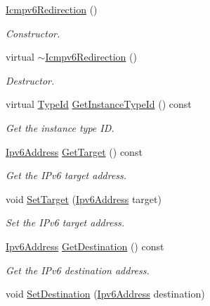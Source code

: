 \begin{DoxyCompactItemize}
\item 
\hyperlink{classns3_1_1Icmpv6Redirection_a6eace6bcc5baaaa530ad738751d29d6c}{Icmpv6\+Redirection} ()
\begin{DoxyCompactList}\small\item\em Constructor. \end{DoxyCompactList}\item 
virtual \hyperlink{classns3_1_1Icmpv6Redirection_a714b0b5bb2fae36e1659a6a1a7512d0d}{$\sim$\+Icmpv6\+Redirection} ()
\begin{DoxyCompactList}\small\item\em Destructor. \end{DoxyCompactList}\item 
virtual \hyperlink{classns3_1_1TypeId}{Type\+Id} \hyperlink{classns3_1_1Icmpv6Redirection_a5cb100dd7c2881b389998086ac890d55}{Get\+Instance\+Type\+Id} () const 
\begin{DoxyCompactList}\small\item\em Get the instance type ID. \end{DoxyCompactList}\item 
\hyperlink{classns3_1_1Ipv6Address}{Ipv6\+Address} \hyperlink{classns3_1_1Icmpv6Redirection_ab03c0b6e0f4bf1472f9ab6f5ea2e63a8}{Get\+Target} () const 
\begin{DoxyCompactList}\small\item\em Get the I\+Pv6 target address. \end{DoxyCompactList}\item 
void \hyperlink{classns3_1_1Icmpv6Redirection_ac93abd1d3faf8ea414f80426905b6d2b}{Set\+Target} (\hyperlink{classns3_1_1Ipv6Address}{Ipv6\+Address} target)
\begin{DoxyCompactList}\small\item\em Set the I\+Pv6 target address. \end{DoxyCompactList}\item 
\hyperlink{classns3_1_1Ipv6Address}{Ipv6\+Address} \hyperlink{classns3_1_1Icmpv6Redirection_a266520561720bfd65eb8d6be7490ff2b}{Get\+Destination} () const 
\begin{DoxyCompactList}\small\item\em Get the I\+Pv6 destination address. \end{DoxyCompactList}\item 
void \hyperlink{classns3_1_1Icmpv6Redirection_a98374c9b46e18bed57c204c155b311be}{Set\+Destination} (\hyperlink{classns3_1_1Ipv6Address}{Ipv6\+Address} destination)

\end{DoxyCompactItemize}
